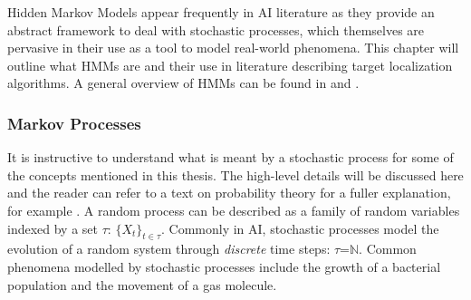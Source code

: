 \placeholder{}
Hidden Markov Models appear frequently in AI literature as they provide an abstract framework to deal with stochastic processes, which themselves are pervasive in their use as a tool to model real-world phenomena. This chapter will outline what HMMs are and their use in literature describing target localization algorithms. A general overview of HMMs can be found in \cite{Murphy1994DynamicLearning} and \cite{Ghahramani2001ANNETWORKS}.

\subsubsection{Markov Processes}
It is instructive to understand what is meant by a stochastic process for some of the concepts mentioned in this thesis. The high-level details will be discussed here and the reader can refer to a text on probability theory for a fuller explanation, for example \cite{papoulis02}. A random process can be described as a family of random variables indexed by a set $\tau$: $\{X_t\}_{t\in\tau}$. Commonly in AI, stochastic processes model the evolution of a random system through \textit{discrete} time steps: $\tau$=$\mathbb N$. Common phenomena modelled by stochastic processes include the growth of a bacterial population and the movement of a gas molecule.\par

